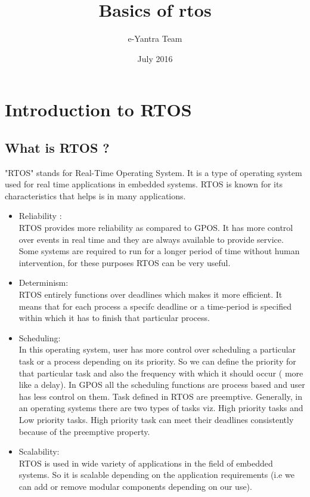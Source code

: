 \documentclass{article}
\begin{document}
\begin{titlepage}
\title{Basics of rtos}
\author{e-Yantra Team }
\date{July 2016}



\maketitle

\end{titlepage}

\listoffigures
\tableofcontents
\newpage

\section{Introduction to RTOS}
\subsection{What is RTOS ?}
"RTOS" stands for Real-Time Operating System.
It is a type of operating system used for real time applications in embedded systems.
RTOS is known for its characteristics that helps is in many applications.
\begin{itemize}

\item Reliability :\\
RTOS provides more reliability as compared to GPOS.
It has more control over events in real time and they are always available to provide service.
Some systems are required to run for a longer period of time without human intervention, for these purposes RTOS can be very useful.

\item Determinism:\\
 RTOS entirely functions over deadlines which makes            it more efficient.
It means that for each process a specifc deadline or a time-period is specified within which it has to finish that particular process.

\item Scheduling:\\
 In this operating system, user has more control over scheduling a particular task or a process depending on its priority.
So we can define the priority for that particular  task and also the frequency with which it should occur ( more like a delay).
In GPOS all the scheduling functions are process based and user has less control on them.
Task defined in RTOS are preemptive. 
Generally, in an operating systems there are two types of tasks viz. High priority tasks and Low priority tasks.
High priority task can meet their deadlines consistently because of the preemptive property.

\item Scalability:\\
RTOS is used in wide variety of applications in the field of embedded systems.
So it is scalable depending on the application requirements (i.e we can add or remove modular components depending on our use).
\end{itemize}
\end{document}
